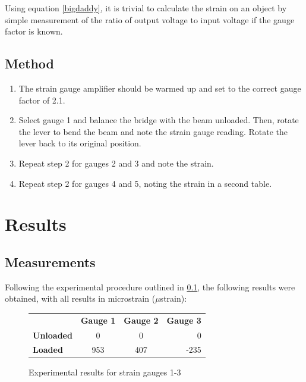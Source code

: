 \documentclass[12pt]{article}
\begin{document}
Using equation \ref{bigdaddy}, it is trivial to calculate the strain on an object by simple measurement of the ratio of output voltage to input voltage if the gauge factor is known.



\subsection{Method}\label{method}

\begin{enumerate}
\item The strain gauge amplifier should be warmed up and set to the correct gauge factor of 2.1.
\item Select gauge 1 and balance the bridge with the beam unloaded. Then, rotate the lever to bend the beam and note the strain gauge reading. Rotate the lever back to its original position.
\item Repeat step 2 for gauges 2 and 3 and note the strain.
\item Repeat step 2 for gauges 4 and 5, noting the strain in a second table.
\end{enumerate}

\section{Results}
\subsection{Measurements}
Following the experimental procedure outlined in \ref{method}, the following results were obtained, with all results in microstrain ($\mu$strain):

\begin{figure}[hb]
\begin{center}
\begin{tabular}{l | c | c | r}

 & \textbf{Gauge 1} & \textbf{Gauge 2} & \textbf{Gauge 3} \\
 \textbf{Unloaded} & 0 & 0 & 0 \\
 \textbf{Loaded} & 953 & 407 & -235 \\

\end{tabular}
\end{center}
\caption{\label{results1} Experimental results for strain gauges 1-3}
\end{figure}
\end{document}
